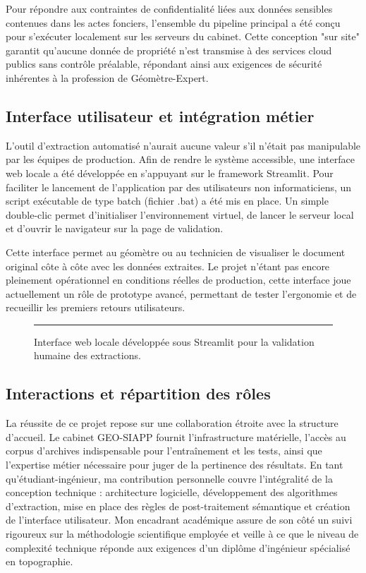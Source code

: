 \documentclass[a4paper,11pt]{article}
\begin{document}
Pour répondre aux contraintes de confidentialité liées aux données sensibles contenues dans les actes fonciers, l'ensemble du pipeline principal a été conçu pour s'exécuter localement sur les serveurs du cabinet. Cette conception "sur site" garantit qu'aucune donnée de propriété n'est transmise à des services cloud publics sans contrôle préalable, répondant ainsi aux exigences de sécurité inhérentes à la profession de Géomètre-Expert.

\subsection{Interface utilisateur et intégration métier}
L'outil d'extraction automatisé n'aurait aucune valeur s'il n'était pas manipulable par les équipes de production. Afin de rendre le système accessible, une interface web locale a été développée en s'appuyant sur le framework Streamlit. Pour faciliter le lancement de l'application par des utilisateurs non informaticiens, un script exécutable de type batch (fichier .bat) a été mis en place. Un simple double-clic permet d'initialiser l'environnement virtuel, de lancer le serveur local et d'ouvrir le navigateur sur la page de validation. 

Cette interface permet au géomètre ou au technicien de visualiser le document original côte à côte avec les données extraites. Le projet n'étant pas encore pleinement opérationnel en conditions réelles de production, cette interface joue actuellement un rôle de prototype avancé, permettant de tester l'ergonomie et de recueillir les premiers retours utilisateurs. 

\begin{figure}[htbp]
    \centering
    \textcolor{gray}{\rule{0.9\textwidth}{7cm}}
    \caption{Interface web locale développée sous Streamlit pour la validation humaine des extractions.}
    \label{fig:interface_streamlit}
\end{figure}

\subsection{Interactions et répartition des rôles}
La réussite de ce projet repose sur une collaboration étroite avec la structure d'accueil. Le cabinet GEO-SIAPP fournit l'infrastructure matérielle, l'accès au corpus d'archives indispensable pour l'entraînement et les tests, ainsi que l'expertise métier nécessaire pour juger de la pertinence des résultats. En tant qu'étudiant-ingénieur, ma contribution personnelle couvre l'intégralité de la conception technique : architecture logicielle, développement des algorithmes d'extraction, mise en place des règles de post-traitement sémantique et création de l'interface utilisateur. Mon encadrant académique assure de son côté un suivi rigoureux sur la méthodologie scientifique employée et veille à ce que le niveau de complexité technique réponde aux exigences d'un diplôme d'ingénieur spécialisé en topographie.
\end{document}
